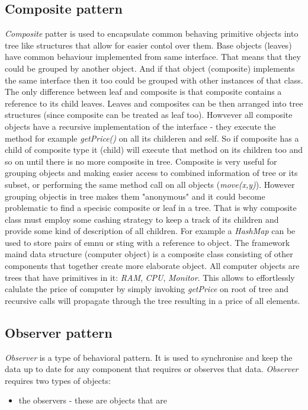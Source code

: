 \documentclass[pdftex,11pt,a4paper]{article}
\begin{document}
\subsection{Composite pattern}
\emph{Composite} patter is used to encapsulate common behaving primitive objects into tree like structures that allow for easier contol over them. Base objects (leaves) have common behaviour implemented from same interface. That means that they could be grouped by another object. And if that object (composite) implements the same interface then it too could be grouped with other instances of that class. The only difference between leaf and composite is that composite contains a reference to its child leaves.
Leaves and composites can be then arranged into tree structures (since composite can be treated as leaf too). Howvever all composite objects have a recursive implementation of the interface - they execute the method for example \emph{getPrice()} on all its childeren and self. So if composite has a child of composite type it (child) will execute that method on its children too and so on until there is no more composite in tree. 
Composite is very useful for grouping objects and making easier access to combined information of tree or its subset, or performing the same method call on all objects (\emph{move(x,y)}). 
However grouping objectis in tree makes them "anonymous" and it could become problematic to find a specisic composite or leaf in a tree. That is why composite class must employ some cashing strategy to keep a track of its children and provide some kind of description of all children. For example a \emph{HashMap} can be used to store pairs of emnu or sting with a reference to object.
The framework maind data structure (computer object) is a composite class consisting of other components that together create more elaborate object. All computer objects are trees that have primitives in it: \emph{RAM}, \emph{CPU}, \emph{Monitor}. This allows to effortlessly calulate the price of computer by simply invoking \emph{getPrice} on root of tree and recursive calls will propagate through the tree resulting in a price of all elements.

\subsection{Observer pattern}
\emph{Observer} is a type of behavioral pattern. It is used to synchronise and keep the data up to date for any component that requires or observes that data. \emph{Observer} requires two types of objects:
\begin{itemize}
	\item the observers - these are objects that are 
\end{itemize}
\end{document}
